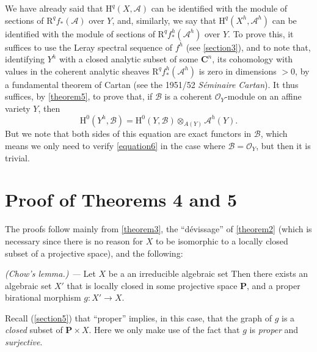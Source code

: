 \documentclass{article}
\theoremstyle{plain}
\newenvironment{lemma}[1]
  {\renewcommand\theinnercustomlemma{#1}\innercustomlemma}
  {\endinnercustomlemma}
\theoremstyle{definition}
\newcommand{\sh}{\mathscr}
\newcommand{\HH}{\mathrm{H}}
\newcommand{\RR}{\mathrm{R}}
\newcommand{\oldpage}[1]{\marginpar{\footnotesize$\Big\vert$ \textit{p.~#1}}}
\begin{document}
We have already said that $\HH^q(X,\sh{A})$ can be identified with the module of sections of $\RR^qf_*(\sh{A})$ over $Y$, and, similarly, we say that $\HH^q(X^h,\sh{A}^h)$ can be identified with the module of sections of $\RR^qf_*^h(\sh{A}^h)$ over $Y$.
To prove this, it suffices to use the Leray spectral sequence of $f^h$ (see \cref{section3}), and to note that, identifying $Y^h$ with a closed analytic subset of some $\mathbf{C}^n$, its cohomology with values in the coherent analytic sheaves $\RR^qf_*^h(\sh{A}^h)$ is zero in dimensions $>0$, by a fundamental theorem of Cartan (see the 1951/52 \emph{Séminaire Cartan}).
It thus suffices, by \cref{theorem5}, to prove that, if $\sh{B}$ is a coherent $\sh{O}_Y$-module on an affine variety $Y$, then
\[
\label{equation6}
  \HH^0(Y^h,\sh{B}) = \HH^0(Y,\sh{B})\otimes_{A(Y)}\sh{A}^h(Y).
  \tag{6}
\]
But we note that both sides of this equation are exact functors in $\sh{B}$, which means we only need to verify \cref{equation6} in the case where $\sh{B}=\sh{O}_Y$, but then it is trivial.


\section{Proof of Theorems 4 and 5}
\label{section7}

The proofs follow mainly from \cref{theorem3}, the ``dévissage'' of \cref{theorem2} (which is necessary since there is no reason for $X$ to be isomorphic to a locally closed subset of a projective space), and the following:

\begin{lemma}{4}
\label{lemma4}
\emph{(Chow's lemma.) ---}
  Let $X$ be a an irreducible algebraic set
  Then there exists an algebraic set $X'$ that is locally closed in some projective space $\mathbf{P}$, and a proper birational morphism $g\colon X'\to X$.
\end{lemma}

Recall (\cref{section5}) that ``proper'' implies, in this case, that the graph of $g$
\oldpage{2-11}
is a \emph{closed} subset of $\mathbf{P}\times X$.
Here we only make use of the fact that $g$ is \emph{proper} and \emph{surjective}.
\end{document}
